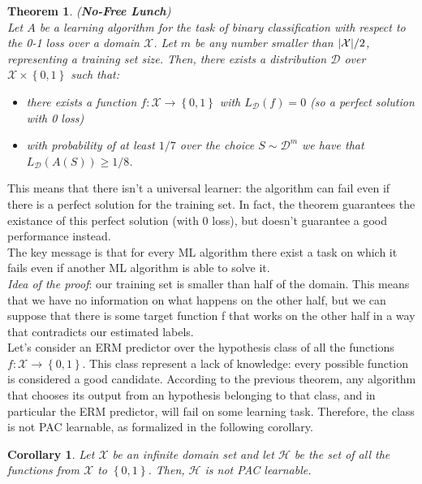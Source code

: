 \documentclass[12pt]{report}
\theoremstyle{plain}
\newtheorem{theorem}{Theorem}[chapter]
\newtheorem{corollary}{Corollary}[theorem]
\newcommand\mcl[1]{\mathcal{#1}}
\begin{document}
\begin{flushleft}
\begin{theorem} (\textbf{No-Free Lunch})\\
	Let $A$ be a learning algorithm for the task of binary classification with respect to the 0-1 loss over a domain $\mcl{X}$. Let $m$ be any number smaller than $\abs{\mcl{X}}/2$, representing a training set size. Then, there exists a distribution $\mcl{D}$ over $\mcl{X}\times\left\{0,1\right\}$ such that:
	\begin{itemize}
		\item there exists a function $f:\mcl{X}\to\left\{0,1\right\}$ with $L_\mcl{D}(f)=0$ (so a perfect solution with 0 loss)
		\item with probability of at least $1/7$ over the choice $S\sim\mcl{D}^m$ we have that $L_\mcl{D}(A(S))\geq 1/8$.
	\end{itemize}
\end{theorem} 
This means that there isn't a universal learner: the algorithm can fail even if there is a perfect solution for the training set. In fact, the theorem guarantees the existance of this perfect solution (with 0 loss), but doesn't guarantee a good performance instead.\\
The key message is that for every ML algorithm there exist a task on which it fails even if another ML algorithm is able to solve it.\\

\vspace{0.3cm}
\textit{Idea of the proof}: our training set is smaller than half of the domain. This means that we have no information on what happens on the other half, but we can suppose that there is some target function f that works on the other half in a way that contradicts our estimated labels.\\

\vspace{0.5cm}
Let's consider an ERM predictor over the hypothesis class of all the functions $f:\mcl{X}\to\left\{0,1\right\}$. This class represent a lack of knowledge: every possible function is considered a good candidate. According to the previous theorem, any algorithm that chooses its output from an hypothesis belonging to that class, and in particular the ERM predictor, will fail on some learning task. Therefore, the class is not PAC learnable, as formalized in the following corollary.\\
\begin{corollary}
	Let $\mcl{X}$ be an infinite domain set and let $\mcl{H}$ be the set of all the functions from $\mcl{X}$ to $\left\{0,1\right\}$. Then, $\mcl{H}$ is not PAC learnable.
\end{corollary}


\end{flushleft}
\end{document}
